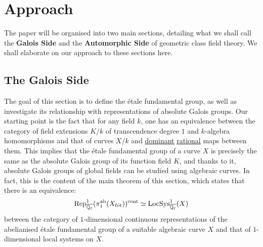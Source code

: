 	\section{Approach}
	    The paper will be organised into two main sections, detailing what we shall call the \textbf{Galois Side} and the \textbf{Automorphic Side} of geometric class field theory. We shall elaborate on our approach to these sections here.

        \subsection{The Galois Side}
            The goal of this section is to define the \'etale fundamental group, as well as investigate its relationship with representations of absolute Galois groups. Our starting point is the fact that for any field $k$, one has an equivalence between the category of field extensions $K/k$ of transcendence degree $1$ and $k$-algebra homomorphisms and that of curves $X/k$ and \href{https://stacks.math.columbia.edu/tag/01RI}{\underline{dominant}} \href{https://stacks.math.columbia.edu/tag/01RR}{\underline{rational}} maps between them. This implies that the \'etale fundamental group of a curve $X$ is precisely the same as the absolute Galois group of its function field $K$, and thanks to it, absolute Galois groups of global fields can be studied using algebraic curves. In fact, this is the content of the main theorem of this section, which states that there is an equivalence:
                $$\mathrm{Rep}^1_{\overline{\mathbb{Q}_{\ell}}}(\pi_1^{\mathrm{ab}}(X_{\mathrm{f\acute{e}t}}))^{\mathrm{cont}} \simeq \mathrm{LocSys}^1_{\overline{\mathbb{Q}_{\ell}}}(X)$$
            between the category of $1$-dimensional continuous representations of the abelianised \'etale fundamental group of a suitable algebraic curve $X$ and that of $1$-dimensional local systems on $X$.
        
